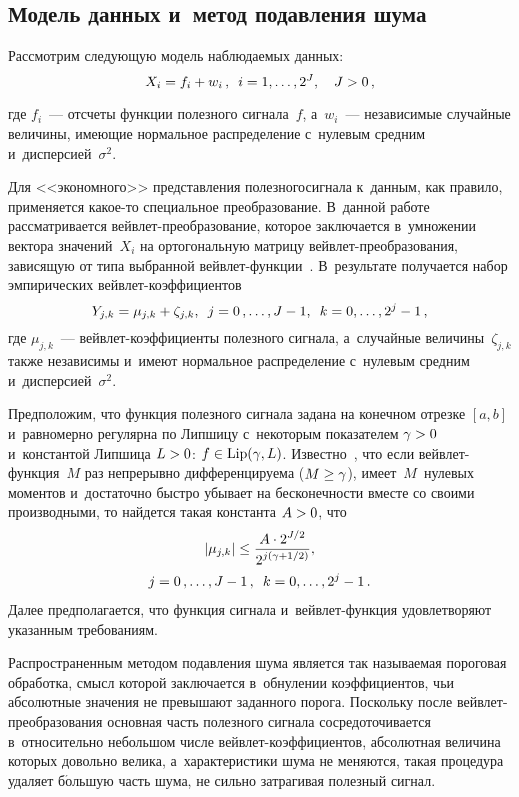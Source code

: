 \begin{multicols}{2}
\section{Модель данных и~метод подавления шума}

Рассмотрим следующую модель наблюдаемых данных:
$$
X_i=f_i+w_i\,,\enskip i=1,\ldots,2^J,\quad J>0\,,
$$

\noindent
где $f_i$~--- отсчеты функции полезного сигнала~$f$, а~$w_i$~--- 
независимые случайные величины, име\-ющие нормальное распределение с~нулевым средним и~дисперсией~$\sigma^2$.

Для <<экономного>> представления полезного\linebreak сигнала к~данным, 
как правило, применяется ка\-кое-то специальное преобразование. 
В~данной работе рассматривается вейв\-лет-пре\-об\-ра\-зо\-ва\-ние,\linebreak 
которое заключается в~умножении вектора значений~$X_i$ на ортогональную матрицу вейв\-лет-пре\-об\-ра\-зо\-ва\-ния, 
зависящую от типа выбранной вейв\-лет-функ\-ции~\cite{Mal99}. 
В~результате получается набор эмпирических вейв\-лет-ко\-эф\-фи\-ци\-ен\-тов
$$
Y_{j,k}=\mu_{j,k}+\zeta_{j,k}, \enskip j=0\,,\ldots,J-1,\enskip k=0,\ldots,2^j-1\,,
$$
где $\mu_{j,k}$~--- вейв\-лет-ко\-эф\-фи\-ци\-ен\-ты полезного сигнала, а~случайные величины~$\zeta_{j,k}$ 
так\-же независимы и~имеют нормальное распределение с~нулевым средним и~дисперсией~$\sigma^2$.

Предположим, что функция полезного сигнала задана на конечном отрезке $[a,b]$ 
и~равномерно регулярна по Липшицу с~некоторым показателем $\gamma\hm>0$ и~константой Липшица 
$L\hm>0$: $f\hm\in\mathrm{Lip}(\gamma,L)$. Известно~\cite{Mal99}, что если вейв\-лет-функ\-ция~$M$ 
раз непрерывно дифференцируема ($M\hm\ge\gamma$), имеет~$M$~нулевых моментов и~достаточно быст\-ро 
убывает на бесконечности вместе со своими производными,
то найдется такая константа $A\hm>0$, что
\begin{multline}
\label{Wavelet_CoeffDecacy}
\left\vert\mu_{j,k}\right\vert\leq\displaystyle\frac{\displaystyle A\cdot 2^{J/2}\mathstrut}{\displaystyle 2^{j\left(\gamma+1/2\right)}\mathstrut}, \\
 j=0\,,\ldots,J-1\,,\enskip k=0,\ldots,2^j-1\,.
\end{multline}
Далее предполагается, что функция сигнала и~вейв\-лет-функ\-ция удовлетворяют указанным тре\-бо\-ва\-ниям.

Распространенным методом подавления шума является так называемая 
пороговая обработка, смысл которой заключается в~обнулении коэффициентов, чьи 
абсолютные значения не превышают заданного порога. Поскольку после вейв\-лет-пре\-об\-ра\-зо\-ва\-ния 
основная часть полезного сигнала сосредоточивается в~относительно небольшом числе 
вейв\-лет-ко\-эф\-фи\-ци\-ен\-тов, 
абсолютная величина которых довольно велика, а~характеристики шума не меняются, такая процедура удаляет 
б$\acute{\mbox{о}}$льшую часть шума, не сильно затрагивая полезный сигнал.


\end{multicols}
